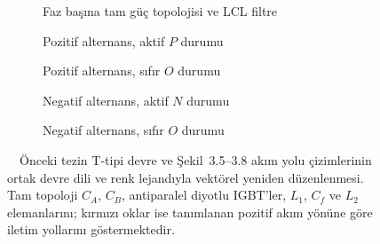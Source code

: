 \begin{figure}[htbp]
  \centering
  \begin{subfigure}[t]{0.96\textwidth}
    \centering
    \resizebox{0.98\linewidth}{!}{\ttypefulltopology}
    \caption{Faz başına tam güç topolojisi ve LCL filtre}
  \end{subfigure}

  \vspace{4mm}
  \begin{subfigure}[t]{0.48\textwidth}
    \centering
    \caption{Pozitif alternans, aktif $P$ durumu}
  \end{subfigure}\hfill
  \begin{subfigure}[t]{0.48\textwidth}
    \centering
    \caption{Pozitif alternans, sıfır $O$ durumu}
  \end{subfigure}

  \vspace{4mm}
  \begin{subfigure}[t]{0.48\textwidth}
    \centering
    \caption{Negatif alternans, aktif $N$ durumu}
  \end{subfigure}\hfill
  \begin{subfigure}[t]{0.48\textwidth}
    \centering
    \caption{Negatif alternans, sıfır $O$ durumu}
  \end{subfigure}
  \caption{\eskitezetiketi\ \juriistegietiketi\ Önceki tezin T-tipi devre ve Şekil~3.5--3.8 akım yolu çizimlerinin ortak devre dili ve renk lejandıyla vektörel yeniden düzenlenmesi. Tam topoloji $C_A$, $C_B$, antiparalel diyotlu IGBT'ler, $L_1$, $C_f$ ve $L_2$ elemanlarını; kırmızı oklar ise tanımlanan pozitif akım yönüne göre iletim yollarını göstermektedir.}
  \label{fig:t-tipi-akim-yollari}
\end{figure}

